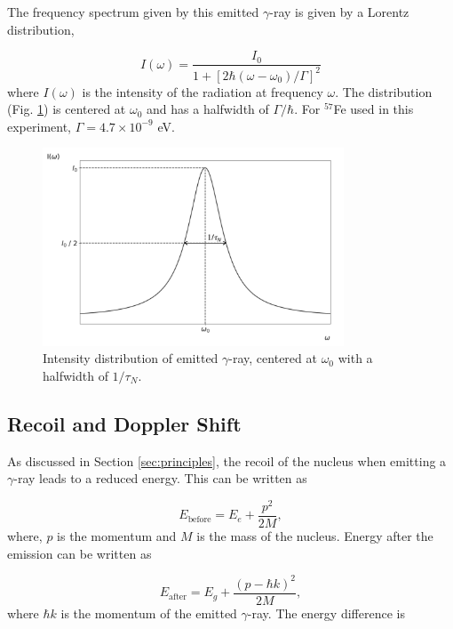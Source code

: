 \documentclass[a4paper]{report}
\numberwithin{equation}{section}
\begin{document}
The frequency spectrum given by this emitted $\gamma$-ray is given by a Lorentz distribution, 

\begin{equation}
		I (\omega) = \frac{I_{0}}{1 + [2 \hbar (\omega - \omega_{0})/\Gamma]^2}
\end{equation}
where $I(\omega)$ is the intensity of the radiation at frequency $\omega$. The distribution (Fig. \ref{fig:lorentz}) is centered at $\omega_{0}$ and has a halfwidth of $\Gamma / \hbar $. For $^{57}$Fe used in this experiment, $\Gamma = 4.7 \times 10^{-9}$ eV. 

\begin{figure}[htpb]
    \centering
    \includegraphics[width=0.8\textwidth]{lorentz}
    \caption{Intensity distribution of emitted $\gamma$-ray, centered at $\omega_{0}$ with a halfwidth of $1 / \tau _{N}$.}
    \label{fig:lorentz}
\end{figure}

\subsection{Recoil and Doppler Shift}

As discussed in Section \ref{sec:principles}, the recoil of the nucleus when emitting a $\gamma$-ray leads to a reduced energy. This can be written as

\begin{equation}
		E_{\mathrm{before}} = E_{e} + \frac{p^2}{2M},
\end{equation}
where, $p$ is the momentum and $M$ is the mass of the nucleus. Energy after the emission can be written as

\begin{equation}
		E_{\mathrm{after}} = E_{g} + \frac{(p - \hbar k)^2}{2M},
\end{equation}
where $\hbar k$ is the momentum of the emitted $\gamma$-ray. The energy difference is 
\end{document}
